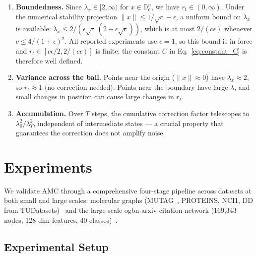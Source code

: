 \documentclass[a4paper,fleqn]{cas-dc}
\begin{document}
\begin{enumerate}
    \item \textbf{Boundedness.} Since $\lambda_x \in [2, \infty)$ for $x \in \mathbb{D}^n_c$, we have $r_t \in (0, \infty)$. Under the numerical stability projection $\|x\| \leq 1/\sqrt{c} - \epsilon$, a uniform bound on $\lambda_x$ is available: $\lambda_x \leq 2/(\epsilon\sqrt{c}\,(2-\epsilon\sqrt{c}))$, which is at most $2/(c\epsilon)$ whenever $c \leq 4/(1+\epsilon)^2$. All reported experiments use $c{=}1$, so this bound is in force and $r_t \in [c\epsilon/2, 2/(c\epsilon)]$ is finite; the constant $C$ in Eq.~\eqref{eq:constant_C} is therefore well defined.
    
    \item \textbf{Variance across the ball.} Points near the origin ($\|x\| \approx 0$) have $\lambda_x \approx 2$, so $r_t \approx 1$ (no correction needed). Points near the boundary have large $\lambda$, and small changes in position can cause large changes in $r_t$.
    
    \item \textbf{Accumulation.} Over $T$ steps, the cumulative correction factor telescopes to $\lambda_0^2/\lambda_T^2$, independent of intermediate states — a crucial property that guarantees the correction does not amplify noise.
\end{enumerate}

\section{Experiments}
\label{sec:experiments}

We validate AMC through a comprehensive four-stage pipeline across datasets at both small and large scales: molecular graphs (MUTAG~\citep{MUTAG}, PROTEINS, NCI1, DD from TUDatasets)~\citep{Xu19} and the large-scale ogbn-arxiv citation network (169,343 nodes, 128-dim features, 40 classes)~\citep{hu2020open}.

\subsection{Experimental Setup}
\label{sec:setup}
\end{document}
